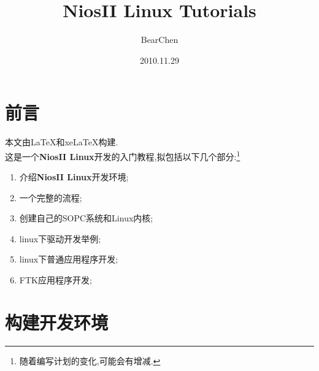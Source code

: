 \documentclass[12pt,a4paper]{article}
\title{NiosII Linux Tutorials}
\author{BearChen}
\date{2010.11.29}
\begin{document}
\maketitle{}
\newpage{}
\section{前言}
\noindent{}本文由\LaTeX{}和xe\LaTeX{}构建.\\这是一个\textbf{NiosII Linux}开发的入门教程,拟包括以下几个部分:\footnote{随着编写计划的变化,可能会有增减.}
\begin{enumerate}
\item 介绍\textbf{NiosII Linux}开发环境;
\item 一个完整的流程;
\item 创建自己的SOPC系统和Linux内核;
\item linux下驱动开发举例;
\item linux下普通应用程序开发;
\item FTK应用程序开发;
\end{enumerate}
\newpage{}
\section{构建开发环境}
\end{document}
